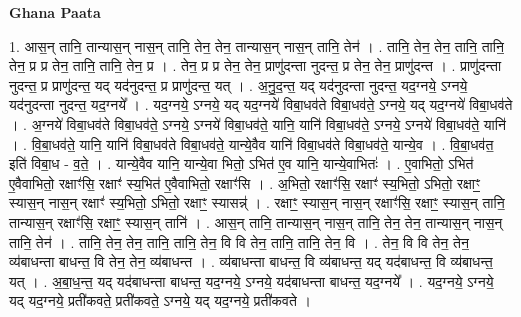 \documentclass[17pt]{extarticle}
\begin{document}
\textbf{Ghana Paata } \newline

1. आस॒न् तानि॒ तान्यास॒न् नास॒न् तानि॒ तेन॒ तेन॒ तान्यास॒न् नास॒न् तानि॒ तेन॑ । . तानि॒ तेन॒ तेन॒ तानि॒ तानि॒ तेन॒ प्र प्र तेन॒ तानि॒ तानि॒ तेन॒ प्र । . तेन॒ प्र प्र तेन॒ तेन॒ प्राणु॑दन्ता नुदन्त॒ प्र तेन॒ तेन॒ प्राणु॑दन्त । . प्राणु॑दन्ता नुदन्त॒ प्र प्राणु॑दन्त॒ यद् यद॑नुदन्त॒ प्र प्राणु॑दन्त॒ यत् । . अ॒नु॒द॒न्त॒ यद् यद॑नुदन्ता नुदन्त॒ यद॒ग्नये॒ ऽग्नये॒ यद॑नुदन्ता नुदन्त॒ यद॒ग्नये᳚ । . यद॒ग्नये॒ ऽग्नये॒ यद् यद॒ग्नये॑ विबा॒धव॑ते विबा॒धव॑ते॒ ऽग्नये॒ यद् यद॒ग्नये॑ विबा॒धव॑ते । . अ॒ग्नये॑ विबा॒धव॑ते विबा॒धव॑ते॒ ऽग्नये॒ ऽग्नये॑ विबा॒धव॑ते॒ यानि॒ यानि॑ विबा॒धव॑ते॒ ऽग्नये॒ ऽग्नये॑ विबा॒धव॑ते॒ यानि॑ । . वि॒बा॒धव॑ते॒ यानि॒ यानि॑ विबा॒धव॑ते विबा॒धव॑ते॒ यान्ये॒वैव यानि॑ विबा॒धव॑ते विबा॒धव॑ते॒ यान्ये॒व । . वि॒बा॒धव॑त॒ इति॑ विबा॒ध - व॒ते॒ । . यान्ये॒वैव यानि॒ यान्ये॒वा भितो॒ ऽभित॑ ए॒व यानि॒ यान्ये॒वाभितः॑ । . ए॒वाभितो॒ ऽभित॑ ए॒वैवाभितो॒ रक्षाꣳ॑सि॒ रक्षाꣳ॑ स्य॒भित॑ ए॒वैवाभितो॒ रक्षाꣳ॑सि । . अ॒भितो॒ रक्षाꣳ॑सि॒ रक्षाꣳ॑ स्य॒भितो॒ ऽभितो॒ रक्षाꣳ॒॒ स्यास॒न् नास॒न् रक्षाꣳ॑ स्य॒भितो॒ ऽभितो॒ 
रक्षाꣳ॒॒ स्यासन्न्॑ । . रक्षाꣳ॒॒ स्यास॒न् नास॒न् रक्षाꣳ॑सि॒ रक्षाꣳ॒॒ स्यास॒न् तानि॒ तान्यास॒न् रक्षाꣳ॑सि॒ रक्षाꣳ॒॒ स्यास॒न् तानि॑ । . आस॒न् तानि॒ तान्यास॒न् नास॒न् तानि॒ तेन॒ तेन॒ तान्यास॒न् नास॒न् तानि॒ तेन॑ । . तानि॒ तेन॒ तेन॒ तानि॒ तानि॒ तेन॒ वि वि तेन॒ तानि॒ तानि॒ तेन॒ वि । . तेन॒ वि वि तेन॒ तेन॒ व्य॑बाधन्ता बाधन्त॒ वि तेन॒ तेन॒ व्य॑बाधन्त । . व्य॑बाधन्ता बाधन्त॒ वि व्य॑बाधन्त॒ यद् यद॑बाधन्त॒ वि व्य॑बाधन्त॒ यत् । . अ॒बा॒ध॒न्त॒ यद् यद॑बाधन्ता बाधन्त॒ यद॒ग्नये॒ ऽग्नये॒ यद॑बाधन्ता बाधन्त॒ यद॒ग्नये᳚ । . यद॒ग्नये॒ ऽग्नये॒ यद् यद॒ग्नये॒ प्रती॑कवते॒ प्रती॑कवते॒ ऽग्नये॒ यद् यद॒ग्नये॒ प्रती॑कवते । \newline
\end{document}
